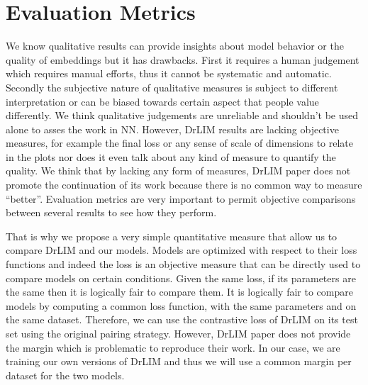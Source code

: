 \documentclass[a4paper,12pt]{report}
\begin{document}
\section{Evaluation Metrics}
We know qualitative results can provide insights about model behavior or the quality of embeddings but it has drawbacks.
First it requires a human judgement which requires manual efforts, thus it cannot be systematic and automatic.
Secondly the subjective nature of qualitative measures is subject to different interpretation or can be biased towards certain aspect that people value differently.
We think qualitative judgements are unreliable and shouldn't be used alone to asses the work in NN.
However, DrLIM results are lacking objective measures, for example the final loss or any sense of scale of dimensions to relate in the plots nor does it even talk about any kind of measure to quantify the quality.
We think that by lacking any form of measures, DrLIM paper does not promote the continuation of its work because there is no common way to measure ``better''.
Evaluation metrics are very important to permit objective comparisons between several results to see how they perform.

That is why we propose a very simple quantitative measure that allow us to compare DrLIM and our models.
Models are optimized with respect to their loss functions and indeed the loss is an objective measure that can be directly used to compare models on certain conditions.
Given the same loss, if its parameters are the same then it is logically fair to compare them.
It is logically fair to compare models by computing a common loss function, with the same parameters and on the same dataset.
Therefore, we can use the contrastive loss of DrLIM on its test set using the original pairing strategy.
However, DrLIM paper does not provide the margin which is problematic to reproduce their work.
In our case, we are training our own versions of DrLIM and thus we will use a common margin per dataset for the two models.



\end{document}
